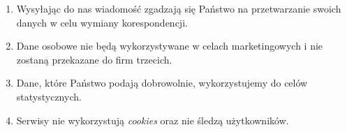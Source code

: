 \documentclass[a4paper,10pt]{article}
\begin{document}
\begin{multicols}{2}
\begin{enumerate}
			\item Wysyłając do nas wiadomość zgadzają się Państwo na przetwarzanie swoich danych w celu wymiany korespondencji.


			\item Dane osobowe nie będą wykorzystywane w celach marketingowych i nie zostaną przekazane do firm trzecich.

			\item Dane, które Państwo podają dobrowolnie, wykorzystujemy do celów statystycznych.

			\item Serwisy nie wykorzystują \textit{cookies} oraz nie śledzą użytkowników.
		\end{enumerate}
	\end{multicols}
\end{document}
